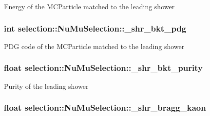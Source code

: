 Energy of the M\-C\-Particle matched to the leading shower \hypertarget{classselection_1_1NuMuSelection_ab5695d0d13afa6fe27e38b63951ade58}{
\subsubsection[{\-\_\-shr\-\_\-bkt\-\_\-pdg}]{\setlength{\rightskip}{0pt plus 5cm}int selection\-::\-Nu\-Mu\-Selection\-::\-\_\-shr\-\_\-bkt\-\_\-pdg\hspace{0.3cm}{\ttfamily [private]}}}\label{classselection_1_1NuMuSelection_ab5695d0d13afa6fe27e38b63951ade58}
P\-D\-G code of the M\-C\-Particle matched to the leading shower \hypertarget{classselection_1_1NuMuSelection_a6988cb9e869c0205f44659b3a65bd047}{
\subsubsection[{\-\_\-shr\-\_\-bkt\-\_\-purity}]{\setlength{\rightskip}{0pt plus 5cm}float selection\-::\-Nu\-Mu\-Selection\-::\-\_\-shr\-\_\-bkt\-\_\-purity\hspace{0.3cm}{\ttfamily [private]}}}\label{classselection_1_1NuMuSelection_a6988cb9e869c0205f44659b3a65bd047}
Purity of the leading shower \hypertarget{classselection_1_1NuMuSelection_a32142048875e97db40e44f0b4a51eae3}{
\subsubsection[{\-\_\-shr\-\_\-bragg\-\_\-kaon}]{\setlength{\rightskip}{0pt plus 5cm}float selection\-::\-Nu\-Mu\-Selection\-::\-\_\-shr\-\_\-bragg\-\_\-kaon\hspace{0.3cm}{\ttfamily [private]}}}\label{classselection_1_1NuMuSelection_a32142048875e97db40e44f0b4a51eae3}
